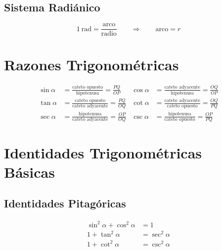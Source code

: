 \documentclass[12pt,a4paper]{article}
\begin{document}
\subsection{Sistema Radiánico}
\[
  1\ \text{rad} = \frac{\text{arco}}{\text{radio}}
  \qquad\Rightarrow\qquad \text{arco} = r
\]

\newpage

\section{Razones Trigonométricas}

\begin{tcolorbox}[formulabox,
  title={Definiciones en triángulo rectángulo con ángulo $\alpha$}]
\begin{align*}
\sin\alpha &= \frac{\text{cateto opuesto}}{\text{hipotenusa}}
           = \frac{PQ}{OP} &
\cos\alpha &= \frac{\text{cateto adyacente}}{\text{hipotenusa}}
           = \frac{OQ}{OP} \\[6pt]
\tan\alpha &= \frac{\text{cateto opuesto}}{\text{cateto adyacente}}
           = \frac{PQ}{OQ} &
\cot\alpha &= \frac{\text{cateto adyacente}}{\text{cateto opuesto}}
           = \frac{OQ}{PQ} \\[6pt]
\sec\alpha &= \frac{\text{hipotenusa}}{\text{cateto adyacente}}
           = \frac{OP}{OQ} &
\csc\alpha &= \frac{\text{hipotenusa}}{\text{cateto opuesto}}
           = \frac{OP}{PQ}
\end{align*}
\end{tcolorbox}

\section{Identidades Trigonométricas Básicas}

\subsection{Identidades Pitagóricas}

\begin{tcolorbox}[formulabox, title={Identidades Pitagóricas}]
\begin{align*}
\sin^2\alpha + \cos^2\alpha &= 1 \tag{1} \\
1 + \tan^2\alpha            &= \sec^2\alpha \tag{2} \\
1 + \cot^2\alpha            &= \csc^2\alpha \tag{3}
\end{align*}
\end{tcolorbox}
\end{document}
